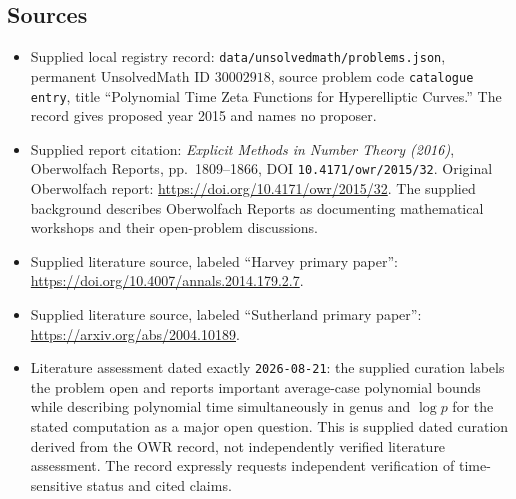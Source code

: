 \documentclass[11pt]{article}
\begin{document}
\subsection{Sources}
\begin{itemize}
\item Supplied local registry record: \texttt{data/unsolvedmath/problems.json}, permanent UnsolvedMath ID \(30002918\), source problem code \texttt{catalogue entry}, title ``Polynomial Time Zeta Functions for Hyperelliptic Curves.'' The record gives proposed year 2015 and names no proposer.
\item Supplied report citation: \emph{Explicit Methods in Number Theory (2016)}, Oberwolfach Reports, pp.~1809--1866, DOI \texttt{10.4171/owr/2015/32}. Original Oberwolfach report: \url{https://doi.org/10.4171/owr/2015/32}. The supplied background describes Oberwolfach Reports as documenting mathematical workshops and their open-problem discussions.
\item Supplied literature source, labeled ``Harvey primary paper'': \url{https://doi.org/10.4007/annals.2014.179.2.7}.
\item Supplied literature source, labeled ``Sutherland primary paper'': \url{https://arxiv.org/abs/2004.10189}.
\item Literature assessment dated exactly \texttt{2026-08-21}: the supplied curation labels the problem open and reports important average-case polynomial bounds while describing polynomial time simultaneously in genus and \(\log p\) for the stated computation as a major open question. This is supplied dated curation derived from the OWR record, not independently verified literature assessment. The record expressly requests independent verification of time-sensitive status and cited claims.
\end{itemize}
\end{document}
